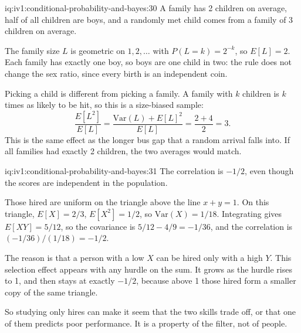\begin{solution}{iq:iv1:conditional-probability-and-bayes:30}
A family has 2 children on average, half of all children are boys, and a randomly met child comes from a family of 3 children on average.

The family size $L$ is geometric on $1, 2, \dots$ with $P(L = k) = 2^{-k}$, so $E[L] = 2$. Each family has exactly one boy, so boys are one child in two: the rule does not change the sex ratio, since every birth is an independent coin.

Picking a child is different from picking a family. A family with $k$ children is $k$ times as likely to be hit, so this is a size-biased sample:
\[
\frac{E[L^2]}{E[L]} = \frac{\mathrm{Var}(L) + E[L]^2}{E[L]} = \frac{2 + 4}{2} = 3.
\]
This is the same effect as the longer bus gap that a random arrival falls into. If all families had exactly 2 children, the two averages would match.

\end{solution}

\begin{solution}{iq:iv1:conditional-probability-and-bayes:31}
The correlation is $-1/2$, even though the scores are independent in the population.

Those hired are uniform on the triangle above the line $x + y = 1$. On this triangle, $E[X] = 2/3$, $E[X^2] = 1/2$, so $\mathrm{Var}(X) = 1/18$. Integrating gives $E[XY] = 5/12$, so the covariance is $5/12 - 4/9 = -1/36$, and the correlation is $(-1/36)/(1/18) = -1/2$.

The reason is that a person with a low $X$ can be hired only with a high $Y$. This selection effect appears with any hurdle on the sum. It grows as the hurdle rises to 1, and then stays at exactly $-1/2$, because above 1 those hired form a smaller copy of the same triangle.

So studying only hires can make it seem that the two skills trade off, or that one of them predicts poor performance. It is a property of the filter, not of people.

\end{solution}

